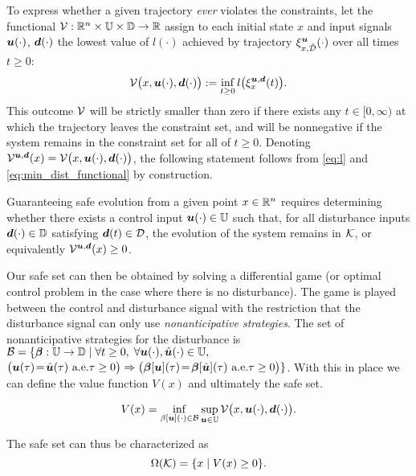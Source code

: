 \documentclass[letterpaper, 10 pt, conference]{ieeeconf}
\begin{document}
To express whether a given trajectory \emph{ever} violates the constraints, let the functional $\mathcal{V}:\mathbb{R}^n\times\mathbb{U}\times\mathbb{D}\to\mathbb{R}$ assign to each initial state $x$ and input signals $\bm{u}(\cdot)$, $\bm{d}(\cdot)$ the lowest value of $l(\cdot)$ achieved by trajectory $\xi_{x,\hat{\mathcal{D}}}^{\bm{u}}(\cdot)$ over all times $t\ge0$: 
\begin{equation}\label{eq:min_dist_functional}
\mathcal{V}\big(x,\bm{u}(\cdot),\bm{d}(\cdot)\big) := \inf_{t\ge 0}l\big(\xi_{x}^{\bm{u},\bm{d}}(t)\big).
\end{equation}
This outcome $\mathcal{V}$ will be strictly smaller than zero if there exists any $t\in[0,\infty)$ at which the trajectory leaves the constraint set, and will be nonnegative if the system remains in the constraint set for all of $t\ge 0$. Denoting $\mathcal{V}^{\bm{u},\bm{d}}(x) = \mathcal{V}\big(x,\bm{u}(\cdot),\bm{d}(\cdot)\big)$, the following statement follows from \eqref{eq:l} and \eqref{eq:min_dist_functional} by construction. 

Guaranteeing safe evolution from a given point $x\in\mathbb{R}^n$ requires determining whether there exists a control input $\bm{u}(\cdot)\in\mathbb{U}$ such that, for all disturbance inputs $\bm{d}(\cdot)\in\mathbb{D}$ satisfying $\bm{d}(t)\in\mathcal{D}$, the evolution of the system remains in $\mathcal{K}$, or equivalently $\mathcal{V}^{\bm{u},\bm{d}}(x)\ge 0$.

Our safe set can then be obtained by solving a differential game (or optimal control problem in the case where there is no disturbance). The game is played between the control and disturbance signal with the restriction that the disturbance signal can  only use  \emph{nonanticipative strategies}. The set of nonanticipative strategies for the disturbance is $\mathcal{B} = \{\bm{\beta}:\mathbb{U}\to\mathbb{D}\;|\;
\forall t\ge 0,\; \forall \bm{u}(\cdot),\hat{\bm{u}}(\cdot)\in\mathbb{U},$
${\big(\bm{u}(\tau) \!=\! \hat{\bm{u}}(\tau)\text{ a.e.} \tau\ge0\big)\Rightarrow
{\big(\bm{\beta}[\bm{u}](\tau) \!=\! \bm{\beta}[\hat{\bm{u}}](\tau)}{\text{ a.e.} \tau\ge0\big)}}\}$. With this in place we can define the value function $V(x)$ and ultimately the safe set. 

\begin{equation}
V(x)=\inf_{\beta[\bm{u}](\cdot) \in \mathcal{B}} \sup_{\bm{u} \in \mathbb{U}}\mathcal{V}\big(x,\bm{u}(\cdot),\bm{d}(\cdot)\big) .
\end{equation}

The safe set can thus be characterized as 
\begin{equation} \label{eq:safe_set}
\Omega(\mathcal{K}) = \{x \mid V(x) \ge 0\}.
\end{equation}  
\end{document}
